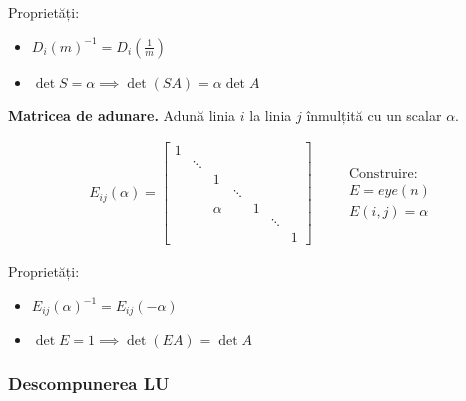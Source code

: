 \documentclass{exam}
\begin{document}
\par Proprietăți:
\begin{itemize}
	\item $D_i(m)^{-1} = D_i (\frac{1}{m})$
	\item $\det S = \alpha \implies \det (SA) = \alpha \det A$
\end{itemize}

\par \textbf{Matricea de adunare.} Adună linia $i$ la linia $j$ înmulțită cu un
scalar $\alpha$.

\begin{equation*}
	\begin{split}
		E_{ij}(\alpha) = \begin{bmatrix}
			                 1 &        &        &        &   &        &   \\
			                   & \ddots &        &        &   &        &   \\
			                   &        & 1      &        &   &        &   \\
			                   &        &        & \ddots &   &        &   \\
			                   &        & \alpha &        & 1 &        &   \\
			                   &        &        &        &   & \ddots &   \\
			                   &        &        &        &   &        & 1
		                 \end{bmatrix}
	\end{split}
	\quad
	\begin{split}
		 & \text{Construire:} \\
		 & E = eye(n)         \\
		 & E (i, j) = \alpha
	\end{split}
\end{equation*}

\par Proprietăți:

\begin{itemize}
	\item $E_{ij}(\alpha)^{-1} = E_{ij}(-\alpha)$
	\item $\det E = 1 \implies \det (EA) = \det A$
\end{itemize}

\subsubsection{Descompunerea LU}
\end{document}
